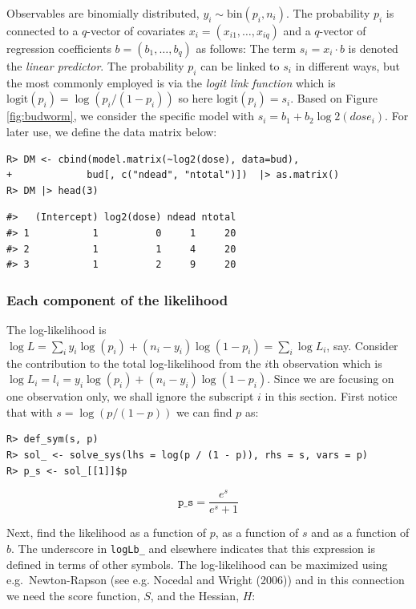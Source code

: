 Observables are binomially distributed, \(y_i \sim \text{bin}(p_i, n_i)\). The probability \(p_i\) is connected to a \(q\)-vector of
covariates \(x_i=(x_{i1}, \dots, x_{iq})\) and a \(q\)-vector of
regression coefficients \(b=(b_1, \dots, b_q)\) as follows: The term
\(s_i = x_i \cdot b\) is denoted the \emph{linear predictor}. The
probability \(p_i\) can be linked to \(s_i\) in different ways, but the
most commonly employed is via the \emph{logit link function} which is
\(\text{logit}(p_i) = \log(p_i/(1-p_i))\) so here \(\text{logit}(p_i) = s_i\). Based on Figure \ref{fig:budworm}, we consider the specific
model with \(s_i = b_1 + b_2 \log2(dose_i)\). For later use, we define the data matrix below:

\begin{verbatim}
R> DM <- cbind(model.matrix(~log2(dose), data=bud),
+             bud[, c("ndead", "ntotal")])  |> as.matrix()
R> DM |> head(3)
\end{verbatim}

\begin{verbatim}
#>   (Intercept) log2(dose) ndead ntotal
#> 1           1          0     1     20
#> 2           1          1     4     20
#> 3           1          2     9     20
\end{verbatim}

\hypertarget{each-component-of-the-likelihood}{%
\subsubsection{Each component of the likelihood}\label{each-component-of-the-likelihood}}

The log-likelihood is \(\log L=\sum_i y_i \log(p_i) + (n_i-y_i) \log(1-p_i) = \sum_i \log L_i\), say.
Consider the contribution to the total log-likelihood from the \(i\)th
observation which is \(\log L_i = l_i = y_i \log(p_i) + (n_i-y_i) \log(1-p_i)\).
Since we are focusing on one observation only, we shall ignore the
subscript \(i\) in this section. First notice that with
\(s = \log(p/(1-p))\) we can find \(p\) as:

\begin{verbatim}
R> def_sym(s, p)
R> sol_ <- solve_sys(lhs = log(p / (1 - p)), rhs = s, vars = p)
R> p_s <- sol_[[1]]$p
\end{verbatim}

\[
\texttt{p\_s} = \frac{e^{s}}{e^{s} + 1}
\]

Next, find the likelihood as a function of \(p\), as a function of \(s\)
and as a function of \(b\). The underscore in \texttt{logLb\_} and elsewhere
indicates that this expression is defined in terms of other
symbols. The log-likelihood can be maximized using e.g.~Newton-Rapson
(see e.g. Nocedal and Wright (2006)) and in this connection we need the score function,
\(S\), and the Hessian, \(H\):

